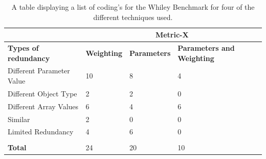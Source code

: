 \begin{table}[h]
\centering

\begin{tabular}{|l|l|l|l|}
\hline
                          & \multicolumn{3}{c|}{{\bf Metric-X}}                   \\ \hline
{\bf Types of redundancy} & {\bf Weighting} & {\bf Parameters} & {\bf Parameters and Weighting} \\ \hline
Different Parameter Value & 10              & 8                & 4                \\ \hline
Different Object Type     & 2               & 2                & 0                \\ \hline
Different Array Values    & 6               & 4                & 6                \\ \hline
Similar                      & 2               & 0                & 0                \\ \hline
Limited Redundancy        & 4               & 6                & 0                \\ \hline
                          &                 &                  &                  \\ \hline
{\bf Total}               & 24              & 20               & 10               \\ \hline
\end{tabular}
\caption{A table displaying a list of coding's for the Whiley Benchmark for four of the different techniques used.}
\label{metriccoding}
\end{table}